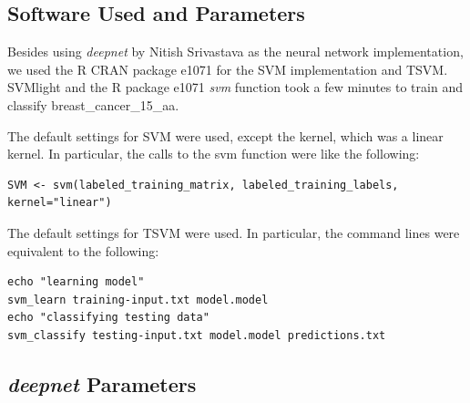 \subsection{Software Used and Parameters}

Besides using \emph{deepnet }by Nitish Srivastava as the neural network
implementation, we used the R CRAN package e1071 \cite{R2008} for
the SVM implementation and TSVM. SVMlight and the R package e1071
\emph{svm} function \cite{Joachims1999,R2008} took a few minutes
to train and classify breast\_cancer\_15\_aa.

The default settings for SVM were used, except the kernel, which was
a linear kernel. In particular, the calls to the svm function were
like the following:

\noindent \begin{verbatim}
SVM <- svm(labeled_training_matrix, labeled_training_labels, kernel="linear")

\end{verbatim}

\noindent The default settings for TSVM were used. In particular,
the command lines were equivalent to the following:

\noindent \begin{verbatim}
echo "learning model"
svm_learn training-input.txt model.model
echo "classifying testing data"
svm_classify testing-input.txt model.model predictions.txt

\end{verbatim}

\subsection{\emph{deepnet }Parameters}

